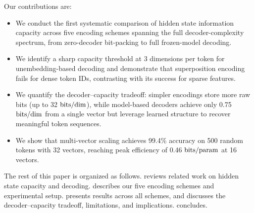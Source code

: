 Our contributions are:
\begin{itemize}[leftmargin=*,itemsep=0pt,topsep=0pt]
    \item We conduct the first systematic comparison of hidden state information capacity across five encoding schemes spanning the full decoder-complexity spectrum, from zero-decoder bit-packing to full frozen-model decoding.
    \item We identify a sharp capacity threshold at 3 dimensions per token for unembedding-based decoding and demonstrate that superposition encoding fails for dense token IDs, contrasting with its success for sparse features.
    \item We quantify the decoder--capacity tradeoff: simpler encodings store more raw bits (up to 32 $\mathrm{bits/dim}$), while model-based decoders achieve only 0.75 $\mathrm{bits/dim}$ from a single vector but leverage learned structure to recover meaningful token sequences.
    \item We show that multi-vector scaling achieves 99.4\% accuracy on 500 random tokens with 32 vectors, reaching peak efficiency of 0.46 $\mathrm{bits/param}$ at 16 vectors.
\end{itemize}

The rest of this paper is organized as follows.  reviews related work on hidden state capacity and decoding.  describes our five encoding schemes and experimental setup.  presents results across all schemes, and  discusses the decoder--capacity tradeoff, limitations, and implications.  concludes.
